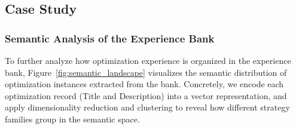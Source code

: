 \documentclass{article}
\theoremstyle{plain}
\theoremstyle{definition}
\theoremstyle{remark}
\begin{document}










\subsection{Case Study}
\subsubsection{Semantic Analysis of the Experience Bank}


To further analyze how optimization experience is organized in the experience bank, Figure~\ref{fig:semantic_landscape} visualizes the semantic distribution of optimization instances extracted from the bank.
Concretely, we encode each optimization record (Title and Description) into a vector representation, and apply dimensionality reduction and clustering to reveal how different strategy families group in the semantic space.
\end{document}
